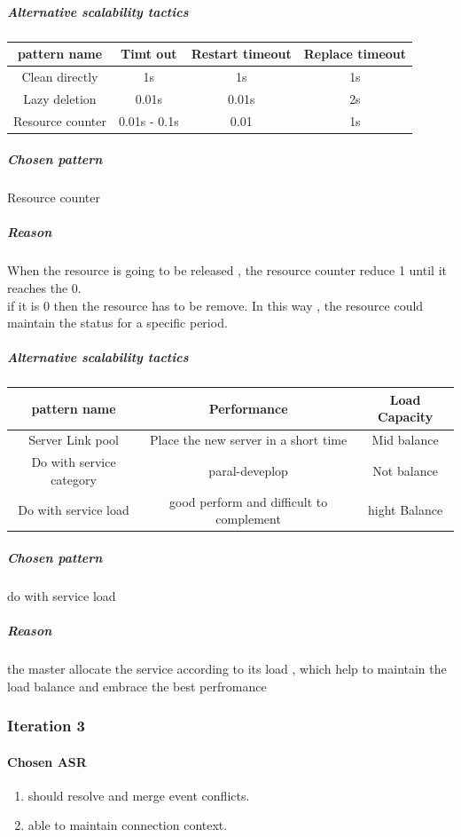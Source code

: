 \documentclass{article}
\begin{document}
					\subparagraph{Alternative scalability tactics}
					\begin{center}
						\begin{tabular}{|c|c|c|c|}
							\hline
							pattern name & Timt out & Restart timeout & Replace timeout\\
							\hline
							Clean directly & 1s & 1s & 1s\\
							\hline
							Lazy deletion & 0.01s & 0.01s & 2s\\
							\hline
							Resource counter & 0.01s - 0.1s & 0.01 & 1s \\
							\hline
						\end{tabular}
					\end{center}
					\subparagraph{Chosen pattern} 
					Resource counter
					\subparagraph{Reason} 
					When the resource is going to be released , the resource counter reduce 1 until it reaches the 0.\\
					if it is 0 then the resource has to be remove. In this way , the resource could maintain the status for a specific period.
				
				\subparagraph{Alternative scalability tactics}
				\begin{center}
					\begin{tabular}{|c|c|c|}
						\hline
						pattern name & Performance & Load Capacity\\
						\hline
						Server Link pool & Place the new server in a short time & Mid balance\\
						\hline
						Do with service category & paral-deveplop & Not balance\\
						\hline
						Do with service load	& good perform and difficult to complement & hight Balance\\
						\hline
					\end{tabular}
				\end{center}
				\subparagraph{Chosen pattern} 
				do with service load
				\subparagraph{Reason} 
				the master allocate the service according to its load , which help to maintain the load balance and embrace the best perfromance
				
		\subsubsection{Iteration 3}
		\paragraph{Chosen ASR}
		\begin{enumerate}
		\item should resolve and merge event conflicts.
		\item able to maintain connection context.
		\end{enumerate}
\end{document}
